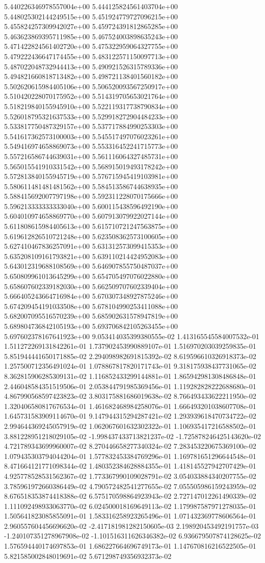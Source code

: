 5.440226346978557004e+00	5.444125824561403704e+00	5.448025302144249515e+00	5.451924779727096215e+00	5.455824257309942027e+00	5.459724391812865285e+00	5.463623869395711985e+00	5.467524003898635243e+00	5.471422824561402720e+00	5.475322959064327755e+00	5.479222436647174455e+00	5.483122571150097713e+00	5.487022048732944413e+00	5.490921526315789336e+00	5.494821660818713482e+00	5.498721138401560182e+00	5.502620615984405106e+00	5.506520093567250917e+00	5.510420228070175952e+00	5.514319705653021764e+00	5.518219840155945910e+00	5.522119317738790834e+00	5.526018795321637533e+00	5.529918272904484233e+00	5.533817750487329157e+00	5.537717884990253303e+00	5.541617362573100003e+00	5.545517497076023261e+00	5.549416974658869073e+00	5.553316452241715773e+00	5.557216586744639031e+00	5.561116064327485731e+00	5.565015541910331542e+00	5.568915019493178242e+00	5.572813840155945719e+00	5.576715945419103981e+00	5.580611481481481562e+00	5.584513586744638935e+00	5.588415692007797198e+00	5.592311228070175666e+00	5.596213333333333040e+00	5.600115438596492190e+00	5.604010974658869770e+00	5.607913079922027144e+00	5.611808615984405613e+00	5.615710721247563875e+00	5.619612826510721248e+00	5.623508362573100605e+00	5.627410467836257091e+00	5.631312573099415353e+00	5.635208109161793821e+00	5.639110214424952083e+00	5.643012319688108569e+00	5.646907855750487037e+00	5.650809961013645299e+00	5.654705497076022880e+00	5.658607602339182030e+00	5.662509707602339404e+00	5.666405243664716984e+00	5.670307348927875246e+00	5.674209454191033508e+00	5.678104990253411088e+00	5.682007095516570239e+00	5.685902631578947819e+00	5.689804736842105193e+00	5.693706842105263455e+00	5.697602378167641923e+00
9.053414035399380555e-02	1.413165545584007532e-01	1.511272269131842261e-01	1.737902453990889107e-01	1.516970203039259835e-01	5.851944441650171885e-02	2.294098982691815392e-02	8.619596610326918373e-02	1.257500712356491024e-01	1.078867817820171743e-01	9.318175938437731065e-02	8.362815906285309131e-02	1.116852433299144881e-01	1.865942981308486848e-01	2.446048584351519506e-01	2.053844791985369456e-01	1.119282828222688680e-01	4.867990568597423823e-02	3.803175881686019638e-02	8.766493433622211950e-02	1.320406580817676534e-01	1.461682468984258076e-01	1.666493201038607708e-01	1.645731583909114670e-01	9.147944315294287421e-02	1.293939618470734722e-02	2.994644369245057919e-02	1.062067601632302322e-01	1.106935417216588502e-01	3.881228951218029105e-02	-1.998437433713821237e-02	-1.725878246425143620e-02	4.721789343699960007e-02	8.270446658277340324e-02	7.283453220675369100e-02	1.079435303794044204e-01	1.577832453384769296e-01	1.169781651296644548e-01	8.471664121771098344e-02	1.480352384628884355e-01	1.418145527942707429e-01	4.925778528531562367e-02	1.773367990109028791e-02	3.054033884340207755e-02	3.785961972660386449e-02	4.790572482541277655e-02	7.055505986159243959e-02	8.676518353874418388e-02	6.575170598864923943e-02	2.727147012261490339e-02	1.111092498933063770e-02	6.024500018169649113e-02	1.179987587971278035e-01	1.505641823085855091e-01	1.583316258923265496e-01	1.071432369778606564e-01	2.960557604456696620e-02	-2.417181981282150605e-03	2.198920453492191757e-03	-1.240107351278967908e-02	-1.101516311626346382e-02	6.936679507874128625e-02	1.576594440174697853e-01	1.686227664696749173e-01	1.147670816216522505e-01	5.821585002848019691e-02	5.671298749356932373e-02
